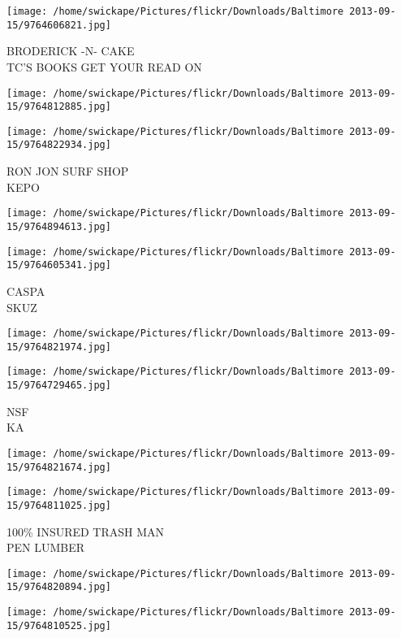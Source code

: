 \documentclass[10pt,letterpaper]{article}
\begin{document}
\vspace{0.25in}
\texttt{[image: /home/swickape/Pictures/flickr/Downloads/Baltimore 2013-09-15/9764606821.jpg]}

BRODERICK {-}N{-} CAKE\\
TC'S BOOKS GET YOUR READ ON
\pagebreak

\texttt{[image: /home/swickape/Pictures/flickr/Downloads/Baltimore 2013-09-15/9764812885.jpg]}

\vspace{0.25in}
\texttt{[image: /home/swickape/Pictures/flickr/Downloads/Baltimore 2013-09-15/9764822934.jpg]}

RON JON SURF SHOP\\
KEPO
\pagebreak

\texttt{[image: /home/swickape/Pictures/flickr/Downloads/Baltimore 2013-09-15/9764894613.jpg]}

\vspace{0.25in}
\texttt{[image: /home/swickape/Pictures/flickr/Downloads/Baltimore 2013-09-15/9764605341.jpg]}

CASPA\\
SKUZ
\pagebreak

\texttt{[image: /home/swickape/Pictures/flickr/Downloads/Baltimore 2013-09-15/9764821974.jpg]}

\vspace{0.25in}
\texttt{[image: /home/swickape/Pictures/flickr/Downloads/Baltimore 2013-09-15/9764729465.jpg]}

NSF\\
KA
\pagebreak

\texttt{[image: /home/swickape/Pictures/flickr/Downloads/Baltimore 2013-09-15/9764821674.jpg]}

\vspace{0.25in}
\texttt{[image: /home/swickape/Pictures/flickr/Downloads/Baltimore 2013-09-15/9764811025.jpg]}

100\% INSURED TRASH MAN\\
PEN LUMBER
\pagebreak

\texttt{[image: /home/swickape/Pictures/flickr/Downloads/Baltimore 2013-09-15/9764820894.jpg]}

\vspace{0.25in}
\texttt{[image: /home/swickape/Pictures/flickr/Downloads/Baltimore 2013-09-15/9764810525.jpg]}
\end{document}
